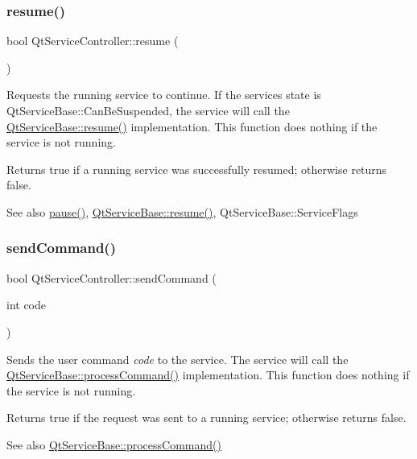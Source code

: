 \subsubsection{\texorpdfstring{resume()}{resume()}}
{\footnotesize\ttfamily bool Qt\+Service\+Controller\+::resume (\begin{DoxyParamCaption}{ }\end{DoxyParamCaption})}

Requests the running service to continue. If the service\textquotesingle{}s state is Qt\+Service\+Base\+::\+Can\+Be\+Suspended, the service will call the \hyperlink{class_qt_service_base_aaa2e05ef1c36283b6b35348c3972b489}{Qt\+Service\+Base\+::resume()} implementation. This function does nothing if the service is not running.

Returns true if a running service was successfully resumed; otherwise returns false.

\begin{DoxySeeAlso}{See also}
\hyperlink{class_qt_service_controller_aeee2fcc9469f77c7ed8a7955c4fa3a07}{pause()}, \hyperlink{class_qt_service_base_aaa2e05ef1c36283b6b35348c3972b489}{Qt\+Service\+Base\+::resume()}, Qt\+Service\+Base\+::\+Service\+Flags 
\end{DoxySeeAlso}
\mbox{\label{class_qt_service_controller_a1428c7d51403416bc7663ae37c446cfc}} 
\subsubsection{\texorpdfstring{send\+Command()}{sendCommand()}}
{\footnotesize\ttfamily bool Qt\+Service\+Controller\+::send\+Command (\begin{DoxyParamCaption}\item[{int}]{code }\end{DoxyParamCaption})}

Sends the user command {\itshape code} to the service. The service will call the \hyperlink{class_qt_service_base_a47485f00f6eba0758d2ffc75092295cf}{Qt\+Service\+Base\+::process\+Command()} implementation. This function does nothing if the service is not running.

Returns true if the request was sent to a running service; otherwise returns false.

\begin{DoxySeeAlso}{See also}
\hyperlink{class_qt_service_base_a47485f00f6eba0758d2ffc75092295cf}{Qt\+Service\+Base\+::process\+Command()} 
\end{DoxySeeAlso}
\mbox{\label{class_qt_service_controller_a503c0fadf098b4c5bbccbb2a57f911e2}} 
